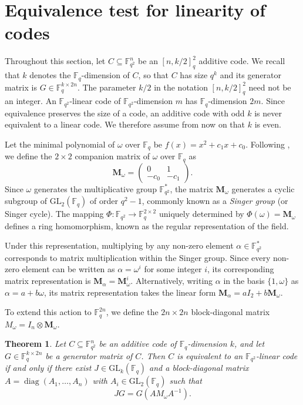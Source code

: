 \documentclass[10pt,a4paper]{amsart}
\theoremstyle{plain}
\newtheorem{theorem}[lemma]{Theorem}
\theoremstyle{definition}
\begin{document}
\section{Equivalence test for linearity of codes}


Throughout this section, let $C \subseteq \mathbb{F}_{q^2}^n$ be an $[n, k/2]_q^2$ additive code. 
We recall that $k$ denotes the $\mathbb{F}_q$-dimension of $C$, so that $C$ has size $q^k$ and its generator matrix is $G \in \mathbb{F}_q^{k \times 2n}$.
The parameter $k/2$ in the notation $[n, k/2]_q^2$ need not be an integer. 
An $\mathbb{F}_{q^2}$-linear code of $\mathbb{F}_{q^2}$-dimension $m$ has $\mathbb{F}_q$-dimension $2m$. Since equivalence preserves the size of a code, an additive code with odd $k$ is never equivalent to a linear code. 
We therefore assume from now on that $k$ is even.


Let the minimal polynomial of $\omega$ over $\mathbb{F}_q$ be $f(x)=x^2+c_1x+c_0$. 
Following \cite[Section 13.2]{mullen2013}, we define the $2 \times 2$ companion matrix of $\omega$ over $\mathbb{F}_q$ as
\[ \mathbf{M}_\omega = \begin{pmatrix} 0 & 1 \\ -c_0 & -c_1 \end{pmatrix}. \]
Since $\omega$ generates the multiplicative group $\mathbb{F}_{q^2}^*$, the matrix $\mathbf{M}_\omega$ generates a cyclic subgroup of $\textrm{GL}_2(\mathbb{F}_q)$ of order $q^2-1$, commonly known as a \textit{Singer group} (or Singer cycle). The mapping $\Phi: \mathbb{F}_{q^2} \to \mathbb{F}_q^{2 \times 2}$ uniquely determined by $\Phi(\omega) = \mathbf{M}_\omega$ defines a ring homomorphism, known as the regular representation of the field. 

Under this representation, multiplying by any non-zero element $\alpha \in \mathbb{F}_{q^2}^*$ corresponds to matrix multiplication within the Singer group. Since every non-zero element can be written as $\alpha = \omega^i$ for some integer $i$, its corresponding matrix representation is $\mathbf{M}_\alpha = \mathbf{M}_\omega^i$. Alternatively, writing $\alpha$ in the basis $\{1, \omega\}$ as $\alpha = a + b\omega$, its matrix representation takes the linear form $\mathbf{M}_\alpha = aI_2 + b\mathbf{M}_\omega$.

To extend this action to $\mathbb{F}_q^{2n}$, we define the $2n \times 2n$ block-diagonal matrix $M_\omega = I_n \otimes \mathbf{M}_\omega$.



\begin{theorem} \label{additivecharacterization}
Let $C \subseteq \mathbb{F}_{q^2}^n$ be an additive code of $\mathbb{F}_q$-dimension $k$, and let $G \in \mathbb{F}_q^{k \times 2n}$ be a generator matrix of $C$. 
Then $C$ is equivalent to an $\mathbb{F}_{q^2}$-linear code if and only if there exist $J \in \textrm{GL}_k(\mathbb{F}_q)$ and a block-diagonal matrix $A = \operatorname{diag}(A_1, \dots, A_n)$ with 
$A_i \in \textrm{GL}_2(\mathbb{F}_q)$
such that
\[ J G = G (A M_\omega A^{-1}). \]
\end{theorem}
\end{document}
